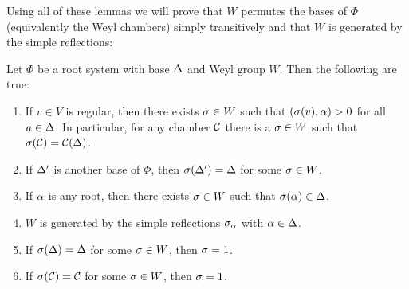 \documentclass[12pt,reqno,oneside]{amsart}
\begin{document}
    Using all of these lemmas we will prove that $W$ permutes the bases of $\Phi$ (equivalently the Weyl chambers) simply transitively and that $W$ is generated by the simple reflections:

    \begin{theorem}\label{thm:Weyl_action_simply_transitively}
        Let $\Phi$ be a root system with base $\Delta$ and Weyl group $W$. Then the following are true:
        \begin{enumerate}[label=(\roman*)]
            \item If $v \in V$ is regular, then there exists $\sigma \in W$ such that $(\sigma(v),\alpha) > 0$ for all $a \in \Delta$. In particular, for any chamber $\mathcal{C}$ there is a $\sigma \in W$ such that $\sigma(\mathcal{C}) = \mathcal{C}(\Delta)$.
            \item If $\Delta'$ is another base of $\Phi$, then $\sigma(\Delta') = \Delta$ for some $\sigma \in W$.
            \item If $\alpha$ is any root, then there exists $\sigma \in W$ such that $\sigma(\alpha) \in \Delta$.
            \item $W$ is generated by the simple reflections $\sigma_{\alpha}$ with $\alpha \in \Delta$.
            \item If $\sigma(\Delta) = \Delta$ for some $\sigma \in W$, then $\sigma = 1$.
            \item If $\sigma(\mathcal{C}) = \mathcal{C}$ for some $\sigma \in W$, then $\sigma = 1$.
        \end{enumerate}
    \end{theorem}
\end{document}
